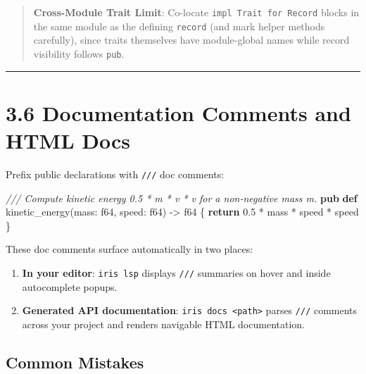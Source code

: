 \documentclass[
  english,
  oneside]{book}
\newenvironment{Shaded}{\begin{snugshade}}{\end{snugshade}}
\newcommand{\CommentTok}[1]{\textcolor[rgb]{0.42,0.60,0.33}{\textit{#1}}}
\newcommand{\ControlFlowTok}[1]{\textcolor[rgb]{0.77,0.53,0.75}{\textbf{#1}}}
\newcommand{\DataTypeTok}[1]{\textcolor[rgb]{0.31,0.79,0.69}{#1}}
\newcommand{\FloatTok}[1]{\textcolor[rgb]{0.71,0.81,0.66}{#1}}
\newcommand{\KeywordTok}[1]{\textcolor[rgb]{0.34,0.61,0.84}{\textbf{#1}}}
\newcommand{\NormalTok}[1]{\textcolor[rgb]{0.83,0.83,0.83}{#1}}
\newcommand{\OperatorTok}[1]{\textcolor[rgb]{0.83,0.83,0.83}{#1}}
\providecommand{\tightlist}{%
  \setlength{\itemsep}{0pt}\setlength{\parskip}{0pt}}
\begin{document}
\begin{quote}
\textbf{Cross-Module Trait Limit}: Co-locate
\texttt{impl\ Trait\ for\ Record} blocks in the same module as the
defining \texttt{record} (and mark helper methods carefully), since
traits themselves have module-global names while record visibility
follows \texttt{pub}.
\end{quote}

\begin{center}\rule{0.5\linewidth}{0.5pt}\end{center}

\section{3.6 Documentation Comments and HTML
Docs}\label{documentation-comments-and-html-docs}

Prefix public declarations with \texttt{///} doc comments:

\begin{Shaded}
\begin{Highlighting}[]
\CommentTok{/// Compute kinetic energy \textasciigrave{}0.5 * m * v * v\textasciigrave{} for a non{-}negative mass \textasciigrave{}m\textasciigrave{}.}
\KeywordTok{pub} \KeywordTok{def}\NormalTok{ kinetic\_energy(mass: }\DataTypeTok{f64}\NormalTok{, speed: }\DataTypeTok{f64}\NormalTok{) }\OperatorTok{{-}\textgreater{}} \DataTypeTok{f64}\NormalTok{ \{}
    \ControlFlowTok{return} \FloatTok{0.5} \OperatorTok{*}\NormalTok{ mass }\OperatorTok{*}\NormalTok{ speed }\OperatorTok{*}\NormalTok{ speed}
\NormalTok{\}}
\end{Highlighting}
\end{Shaded}

These doc comments surface automatically in two places:

\begin{enumerate}
\def\labelenumi{\arabic{enumi}.}
\tightlist
\item
  \textbf{In your editor}: \texttt{iris\ lsp} displays \texttt{///}
  summaries on hover and inside autocomplete popups.
\item
  \textbf{Generated API documentation}:
  \texttt{iris\ docs\ \textless{}path\textgreater{}} parses \texttt{///}
  comments across your project and renders navigable HTML documentation.
\end{enumerate}

\subsection{Common Mistakes}\label{common-mistakes-2}
\end{document}
